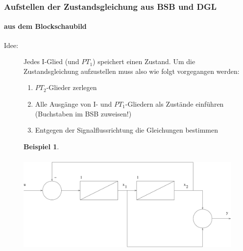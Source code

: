 \documentclass[12pt,a4paper,ngerman]{scrartcl}
\newtheorem{bsp}{Beispiel}[section] %
\begin{document}
\subsubsection{Aufstellen der Zustandsgleichung aus BSB und DGL}

\paragraph{aus dem Blockschaubild}
\begin{description}
\item[Idee:] Jedes I-Glied (und $PT_1$) speichert einen Zustand. Um die Zustandsgleichung aufzustellen muss also wie folgt vorgegangen werden:
  \begin{enumerate}
  \item $PT_2$-Glieder zerlegen
  \item Alle Ausgänge von I- und $PT_1$-Gliedern als Zustände einführen (Buchstaben im BSB zuweisen!)
  \item Entgegen der Signalflussrichtung die Gleichungen bestimmen
  \end{enumerate}
\end{description}
\begin{figure}[H]
\begin{bsp}
\end{bsp}
  \includegraphics[height=5cm]{sysregel_bsp_2-3}
\end{figure}
\end{document}
